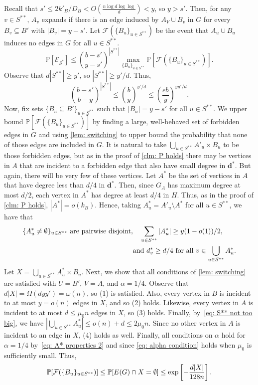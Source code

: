 \documentclass[11pt]{article}
\def\P{\mathbb P}
\theoremstyle{plain}
\begin{document}
Recall that $s' \leq 2k'_B/D_B < O\left(\frac{n\log d\log\log}{d}\right) < y$, so $y > s'$. Then, for any $v \in S^{**}$, $A_v$ expands if there is an edge induced by $A_V \cup B_v$ in $G$ for every $B_v \subseteq B'$ with $|B_v| = y-s'$. Let $\mathcal F(\{B_u\}_{u \in S^{**}})$ be the event that $A_u \cup B_u$ induces no edges in $G$ for all $u \in S^{**}$. 
\begin{equation}\label{eq: prob S*}
    \P[\mathcal E_{S^*}] \leq \binom{b - s'}{y - s'}^{|S^{**}|}\max_{\{B_u\}_{u \in S^{**}}}\P[\mathcal F(\{B_u\}_{u \in S^{**}})].
\end{equation}
Observe that $d|S^{**}|\geq y'$, so $|S^{**}|\geq y'/d$. Thus,
\begin{equation}\label{eq: bounding Bu}
    \binom{b - s'}{b - y}^{|S^{**}|} \leq \binom{b}{y}^{y'/d} \leq \left(\frac{eb}{y}\right)^{yy'/d}.
\end{equation}
Now, fix sets $\{B_u \subseteq B'\}_{u \in S^{**}}$ such that $|B_u| = y - s'$ for all $u \in S^{**}$.  We upper bound $\P[\mathcal F(\{B_u\}_{u \in S^{**}})]$ by finding a large, well-behaved set of forbidden edges in $G$ and using \cref{lem: switching} to upper bound the probability that none of those edges are included in $G$. It is natural to take $\bigcup_{u \in S^{**}}A'_u \times B_u$ to be those forbidden edges, but as in the proof of \cref{clm: P holds} there may be vertices in $A$ that are incident to a forbidden edge that also have small degree in $\mathbf d^*$. But again, there will be very few of these vertices. Let $A^*$ be the set of vertices in $A$ that have degree less than $d/4$ in $\mathbf d^*$. Then, since $G_A$ has maximum degree at most $d/2$, each vertex in $A^*$ has degree at least $d/4$ in $H$. Thus, as in the proof of \cref{clm: P holds}, $|A^*| = o(k_B)$. Hence, taking $A^*_u = A'_u \setminus A^*$ for all $u \in S^{**}$, we have that 
\begin{align}
    \{A^*_u \neq \emptyset\}_{u \in S^{**}} \text{ are pairwise disjoint},& \quad \sum_{u \in S^{**}}|A^*_u| \geq y(1 - o(1))/2, \quad \notag\\
    &\text{and $d^*_v \geq d/4$ for all $v \in \bigcup_{u \in S^{**}}A^*_u$.} \label{eq: A* properties 2}
\end{align}
Let $X = \bigcup_{u \in S^{**}}A^*_u \times B_u$. Next, we show that all conditions of \cref{lem: switching} are satisfied with $U = B'$, $V = A$, and $\alpha = 1/4$. Observe that $d|X| = \Omega(dyy') = \omega(n)$, so (1) is satisfied. Also, every vertex in $B$ is incident to at most $y = o(n)$ edges in $X$, and so (2) holds. Likewise, every vertex in $A$ is incident to at most $d \leq \mu_0n$ edges in $X$, so (3) holds. Finally, by~\eqref{eq: S** not too big}, we have $|\bigcup_{u \in S^{**}}A^*_u| \leq o(n) + d \leq 2\mu_0n$. Since no other vertex in $A$ is incident to an edge in $X$, (4) holds as well. Finally, all conditions on $\alpha$ hold for $\alpha = 1/4$ by~\eqref{eq: A* properties 2} and since \eqref{eq: alpha condition} holds when $\mu_0$ is sufficiently small. Thus,
\begin{equation}\notag
    \P[\mathcal F(\{B_u\}_{u \in S^{**}})]\leq\P[E(G) \cap X = \emptyset] \leq \exp\left[-\frac{d|X|}{128n}\right].
\end{equation}
\end{document}

